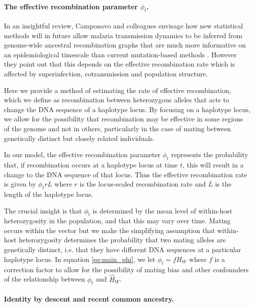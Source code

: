 \documentclass[_main.tex]{subfiles}
\begin{document}
\paragraph{The effective recombination parameter $\phi_t$.}  In an insightful review, Camponovo and colleagues envisage how new statistical methods \cite{Kelleher2019,Speidel2019} will in future allow malaria transmission dynamics to be inferred from genome-wide ancestral recombination graphs that are much more informative on an epidemiological timescale than current mutation-based methods \cite{Camponovo2023}.  However they point out that this depends on the effective recombination rate which is affected by superinfection, cotransmission and population structure.

Here we provide a method of estimating the rate of effective recombination, which we define as recombination between heterozygous alleles that acts to change the DNA sequence of a haplotype locus.  By focusing on a haplotype locus, we allow for the possibility that recombination may be effective in some regions of the genome and not in others, particularly in the case of mating between genetically distinct but closely related individuals. 

In our model, the effective recombination parameter $\phi_t$ represents the probability that, if recombination occurs at a haplotype locus at time $t$, this will result in a change to the DNA sequence of that locus.  Thus the effective recombination rate is given by $\phi_t r L$ where $r$ is the locus-scaled recombination rate and $L$ is the length of the haplotype locus. 

The crucial insight is that $\phi_t$ is determined by the mean level of within-host heterozygosity in the population, and that this may vary over time.  Mating occurs within the vector but we make the simplifying assumption that within-host heterozygosity determines the probability that two mating alleles are genetically distinct, i.e. that they have different DNA sequences at a particular haplotype locus.  In equation \ref{eq:main_phi}, we let $\phi_t = f \widehat{H}_W$ where $f$ is a correction factor to allow for the possibility of mating bias and other confounders of the relationship between $\phi_t$ and $\widehat{H}_W$.

\paragraph{Identity by descent and recent common ancestry.}  \label{main_ibd_discussion}  
\end{document}

